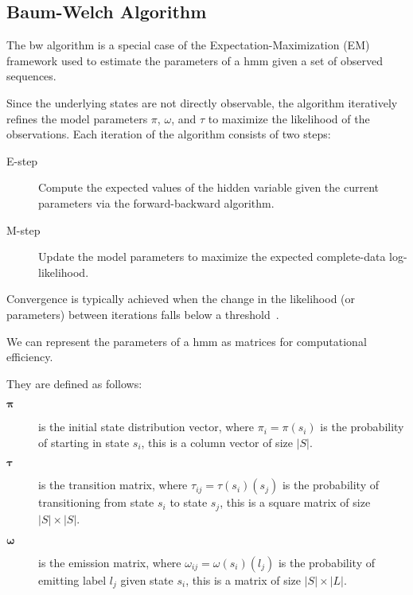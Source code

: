 
\subsection{Baum-Welch Algorithm}\label{subsec:baum-welch}
The \gls{bw} algorithm is a special case of the Expectation-Maximization (EM) framework used to estimate the parameters of a \gls{hmm} given a set of observed sequences.

Since the underlying states are not directly observable, the algorithm iteratively refines the model parameters $\pi$, $\omega$, and $\tau$ to maximize the likelihood of the observations.
Each iteration of the algorithm consists of two steps:


\begin{description}
    \item[E-step] Compute the expected values of the hidden variable given the current parameters via the forward-backward algorithm.
    \item[M-step] Update the model parameters to maximize the expected complete-data log-likelihood.
\end{description}


Convergence is typically achieved when the change in the likelihood (or parameters) between iterations falls below a threshold~\cite{Rabiner89}.

We can represent the parameters of a \gls{hmm} as matrices for computational efficiency.

They are defined as follows:


\begin{description}
    \item[$\pmb{\pi}$] is the initial state distribution vector, where $\pi_i = \pi(s_i)$ is the probability of starting in state $s_i$, this is a column vector of size $|S|$.
    \item[$\pmb{\tau}$] is the transition matrix, where $\tau_{ij} = \tau(s_i)(s_j)$ is the probability of transitioning from state $s_i$ to state $s_j$, this is a square matrix of size $|S| \times |S|$.
    \item[$\pmb{\omega}$] is the emission matrix, where $\omega_{ij} = \omega(s_i)(l_j)$ is the probability of emitting label $l_j$ given state $s_i$, this is a matrix of size $|S| \times |L|$.
\end{description}


